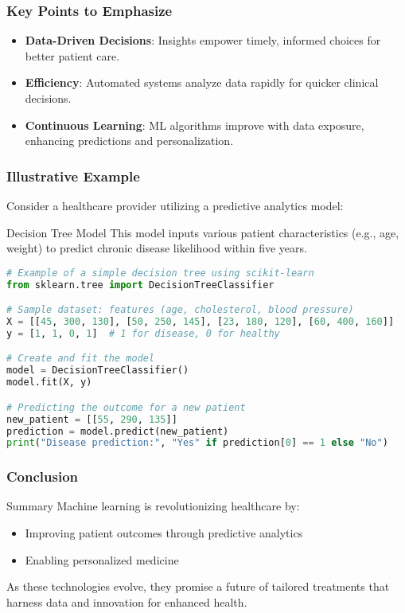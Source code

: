 \documentclass[aspectratio=169]{beamer}
\begin{document}
\begin{frame}[fragile]
    \frametitle{Key Points to Emphasize}
    \begin{itemize}
        \item \textbf{Data-Driven Decisions}: Insights empower timely, informed choices for better patient care.
        \item \textbf{Efficiency}: Automated systems analyze data rapidly for quicker clinical decisions.
        \item \textbf{Continuous Learning}: ML algorithms improve with data exposure, enhancing predictions and personalization.
    \end{itemize}
\end{frame}

\begin{frame}[fragile]
    \frametitle{Illustrative Example}
    Consider a healthcare provider utilizing a predictive analytics model:

    \begin{block}{Decision Tree Model}
        This model inputs various patient characteristics (e.g., age, weight) to predict chronic disease likelihood within five years.
    \end{block}
    
    \begin{lstlisting}[language=Python]
# Example of a simple decision tree using scikit-learn
from sklearn.tree import DecisionTreeClassifier

# Sample dataset: features (age, cholesterol, blood pressure) 
X = [[45, 300, 130], [50, 250, 145], [23, 180, 120], [60, 400, 160]]
y = [1, 1, 0, 1]  # 1 for disease, 0 for healthy

# Create and fit the model
model = DecisionTreeClassifier()
model.fit(X, y)

# Predicting the outcome for a new patient
new_patient = [[55, 290, 135]]
prediction = model.predict(new_patient)
print("Disease prediction:", "Yes" if prediction[0] == 1 else "No")
    \end{lstlisting}
\end{frame}

\begin{frame}[fragile]
    \frametitle{Conclusion}
    \begin{block}{Summary}
        Machine learning is revolutionizing healthcare by:
        \begin{itemize}
            \item Improving patient outcomes through predictive analytics
            \item Enabling personalized medicine
        \end{itemize}
        As these technologies evolve, they promise a future of tailored treatments that harness data and innovation for enhanced health.
    \end{block}
\end{frame}
\end{document}
